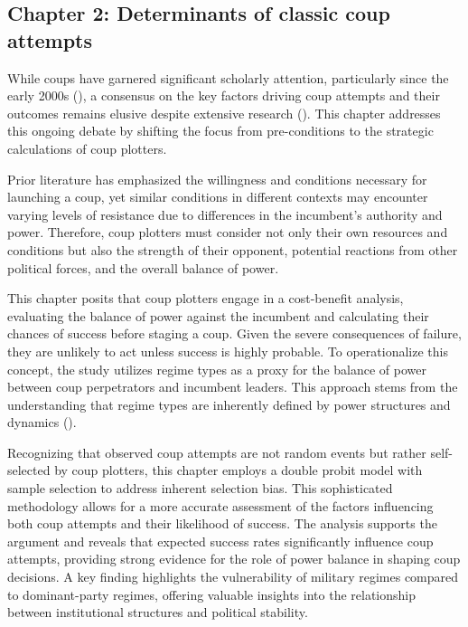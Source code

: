 \documentclass[
  12pt,
]{report}
\begin{document}
\subsection*{Chapter 2: Determinants of classic coup
attempts}\label{chapter-2-determinants-of-classic-coup-attempts}

While coups have garnered significant scholarly attention, particularly
since the early 2000s (), a consensus on the key factors driving coup attempts and their
outcomes remains elusive despite extensive research
(). This
chapter addresses this ongoing debate by shifting the focus from
pre-conditions to the strategic calculations of coup plotters.

Prior literature has emphasized the willingness and conditions necessary
for launching a coup, yet similar conditions in different contexts may
encounter varying levels of resistance due to differences in the
incumbent's authority and power. Therefore, coup plotters must consider
not only their own resources and conditions but also the strength of
their opponent, potential reactions from other political forces, and the
overall balance of power.

This chapter posits that coup plotters engage in a cost-benefit
analysis, evaluating the balance of power against the incumbent and
calculating their chances of success before staging a coup. Given the
severe consequences of failure, they are unlikely to act unless success
is highly probable. To operationalize this concept, the study utilizes
regime types as a proxy for the balance of power between coup
perpetrators and incumbent leaders. This approach stems from the
understanding that regime types are inherently defined by power
structures and dynamics ().

Recognizing that observed coup attempts are not random events but rather
self-selected by coup plotters, this chapter employs a double probit
model with sample selection to address inherent selection bias. This
sophisticated methodology allows for a more accurate assessment of the
factors influencing both coup attempts and their likelihood of success.
The analysis supports the argument and reveals that expected success
rates significantly influence coup attempts, providing strong evidence
for the role of power balance in shaping coup decisions. A key finding
highlights the vulnerability of military regimes compared to
dominant-party regimes, offering valuable insights into the relationship
between institutional structures and political stability.
\end{document}
